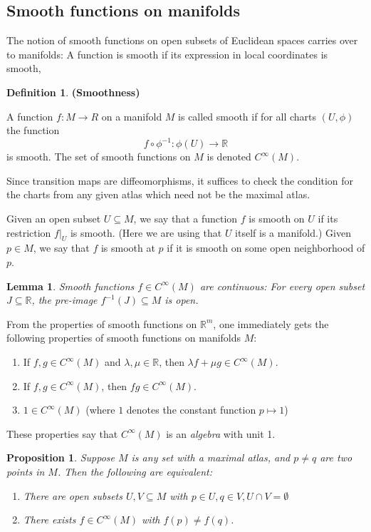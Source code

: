 \documentclass{article}
\newtheorem{proposition}{Proposition}[theorem]
\newtheorem{lemma}[theorem]{Lemma}
\theoremstyle{definition}
\newtheorem{defn}[theorem]{Definition}
\newenvironment{definition}
  {\vspace{8pt}\begin{mdframed}[backgroundcolor=blueish]\begin{defn}}
  {\end{defn}\end{mdframed}\vspace{4pt}}
\begin{document}
\subsection{Smooth functions on manifolds}
The notion of smooth functions on open subsets of Euclidean spaces
carries over to manifolds: A function is smooth if its expression in local coordinates is smooth,

\begin{definition} \textbf{(Smoothness)}

A function $f : M \rightarrow R$ on a manifold $M$ is called smooth if for all charts $(U,\phi)$ the function
\[
    f \circ\phi^{-1}: \phi(U) \rightarrow \mathbb{R}
\]
is smooth. The set of smooth functions on $M$ is denoted $C^{\infty}(M)$.
\end{definition}

Since transition maps are diffeomorphisms, it suffices to check the condition for the charts from any given atlas which need not be the maximal atlas.

Given an open subset $U \subseteq M$, we say that a function $f$ is smooth on $U$ if its restriction $f |_U$ is smooth. (Here we are using that $U$ itself is a manifold.) Given $p \in M$, we say that $f$ is smooth at $p$ if it is smooth on some open neighborhood
of $p$.

\begin{lemma}
Smooth functions $f \in C^{\infty}(M)$ are continuous: For every open subset $J \subseteq \mathbb R$, the pre-image $f^{-1}(J) \subseteq M$ is open.
\end{lemma}


From the properties of smooth functions on $\mathbb R^m$, one immediately gets the following properties of smooth functions on manifolds $M$:
\begin{enumerate}
    \item If $f,g \in C^{\infty}(M)$ and $\lambda, \mu \in \mathbb R$, then $\lambda f + \mu g \in C^\infty(M)$.
    \item If $f,g \in C^\infty(M)$, then $f g \in C^\infty(M)$.
    \item $1 \in C^{\infty}(M)$ (where $1$ denotes the constant function $p \mapsto 1$)
\end{enumerate}

These properties say that $C^{\infty}(M)$ is an \textit{algebra} with unit 1. 

\begin{proposition}
Suppose $M$ is any set with a maximal atlas, and $p \neq q$ are two points in $M$. Then the following are equivalent:
\begin{enumerate}
    \item There are open subsets $U,V \subseteq M$ with $p \in U, q \in V, U \cap V = \emptyset$
    \item There exists $f \in C^\infty(M)$ with $f(p) \neq f(q)$.
\end{enumerate}
\end{proposition}
\end{document}
